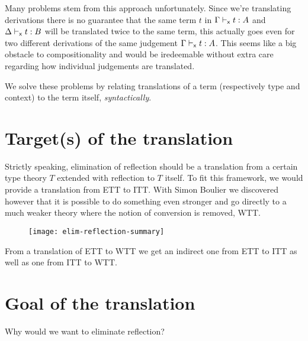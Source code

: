 Many problems stem from this approach unfortunately. Since we're translating
derivations there is no guarantee that the same term \(t\) in
\(\Gamma \vdash_{\mathsf{x}} t : A\) and \(\Delta \vdash_{\mathsf{x}} t : B\) will be translated
twice to the same term, this actually goes even for two different derivations
of the same judgement \(\Gamma \vdash_{\mathsf{x}} t : A\).
This seems like a big obstacle to compositionality and would be iredeemable
without extra care regarding how individual judgements are translated.

We solve these problems by relating translations of a term (respectively
type and context) to the term itself, \emph{syntactically}.

\section{Target(s) of the translation}

Strictly speaking, elimination of reflection should be a translation from a
certain type theory \(T\) extended with reflection to \(T\) itself.
To fit this framework, we would provide a translation from \acrshort{ETT}
to \acrshort{ITT}. With Simon Boulier we discovered however that it is possible
to do something even stronger and go directly to a much weaker theory where
the notion of conversion is removed, \acrshort{WTT}.

\begin{figure}[hb]
  \texttt{[image: elim-reflection-summary]}
\end{figure}

From a translation of \acrshort{ETT} to \acrshort{WTT} we get an indirect one
from \acrshort{ETT} to \acrshort{ITT} as well as one from \acrshort{ITT} to
\acrshort{WTT}.

\section{Goal of the translation}



Why would we want to eliminate reflection?